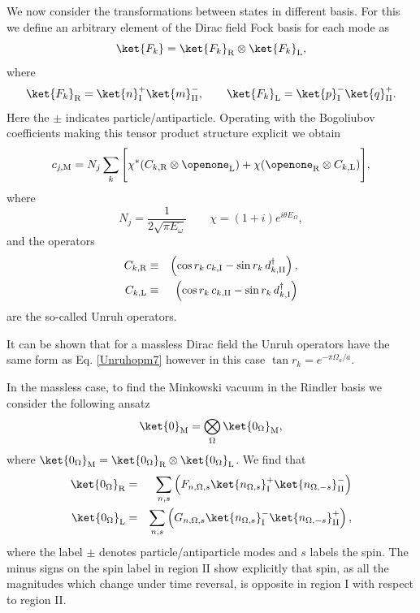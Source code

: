 We now consider the transformations between states in different basis. For this we define an arbitrary element of the Dirac field Fock basis for each mode as
\begin{equation}
\ket{F_k}=\ket{F_k}_\text{\text{R}}\otimes \ket{F_k}_\text{\text{L}},
\end{equation}
where 
\begin{equation}
\nonumber\ket{F_k}_\text{R}=\ket{n}^+_\text{I}\ket{m}^-_\text{II},\qquad \ket{F_k}_\text{L}=\ket{p}^-_\text{I}\ket{q}^+_\text{II}.
\end{equation}
Here the $\pm$  indicates particle/antiparticle. Operating with the Bogoliubov coefficients making this tensor product structure explicit we obtain
\begin{equation}\label{annihil}
c_{j,\text{M}}=N_j\sum_k\Bigg[\chi^*(C_{k,\text{\text{R}}}\otimes\openone_\text{\text{L}})+\chi(\openone_\text{\text{R}}\otimes C_{k,\text{\text{L}}})\Bigg],
\end{equation}
where
\begin{equation}\label{ene}
N_j=\frac{1}{2\sqrt{\pi E_\omega}}\qquad  \chi=(1+i)e^{i\theta E_{\Omega}},
\end{equation}
and the operators
\begin{eqnarray}\label{Unruhopm7}
\nonumber C_{k,\text{\text{R}}}&\equiv&\left(\cos r_k\, c_{k,\text{I}}-\sin r_k\, d^\dagger_{k,\text{II}}\right),\\*
C_{k,\text{\text{L}}}&\equiv&\left(\cos r_k\, c_{k,\text{II}}-\sin r_k\, d^\dagger_{k,\text{I}}\right)
\end{eqnarray}
are the so-called Unruh operators. 

It can be shown \cite{ch1} that for a massless Dirac field the Unruh operators have the same form as Eq. \eqref{Unruhopm7} however in this case $\tan r_{k}=e^{-\pi\Omega_a/a}$.

In the massless case, to find the Minkowski vacuum in the Rindler basis we consider the following ansatz
\begin{equation}
\ket{0}_\text{M}=\bigotimes_{\Omega}\ket{0_\Omega}_\text{M},
\end{equation}
where $\ket{0_\Omega}_\text{M}=\ket{0_\Omega}_\text{\text{R}}\otimes\ket{0_\Omega}_\text{\text{L}}$.
We find that
\begin{eqnarray}
\label{vauno}
\ket{0_{\Omega}}_\text{\text{R}}&=&\sum_{n,s}\left(F_{n,\Omega,s}\ket{n_{\Omega,s}}^+_\text{I}\ket{n_{\Omega,-s}}^-_\text{II}\right)\nonumber \\
\ket{0_{\Omega}}_\text{\text{L}}&=&\sum_{n,s}\left(G_{n,\Omega,s}\ket{n_{\Omega,s}}^-_\text{I}\ket{n_{\Omega,-s}}^+_\text{II}\right),
\end{eqnarray}
where the label $\pm$ denotes particle/antiparticle modes  and $s$ labels the spin. The minus signs on the spin label in region $\text{II}$ show explicitly that spin, as all the magnitudes which change under time reversal, is opposite in region I with respect to region II.

